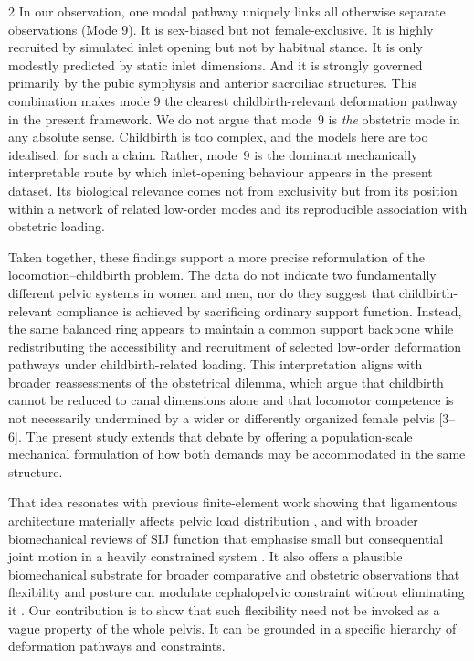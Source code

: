 \documentclass[openacc]{rsproca_new}
\begin{document}
\begin{multicols}{2}
In our observation, one modal pathway uniquely links all otherwise separate observations (Mode 9). It is sex-biased but not female-exclusive. It is highly recruited by simulated inlet opening but not by habitual stance. It is only modestly predicted by static inlet dimensions. And it is strongly governed primarily by the pubic symphysis and anterior sacroiliac structures. This combination makes mode 9 the clearest childbirth-relevant deformation pathway in the present framework. We do not argue that mode~9 is \emph{the} obstetric mode in any absolute sense. Childbirth is too complex, and the models here are too idealised, for such a claim. Rather, mode~9 is the dominant mechanically interpretable route by which inlet-opening behaviour appears in the present dataset. Its biological relevance comes not from exclusivity but from its position within a network of related low-order modes and its reproducible association with obstetric loading.

Taken together, these findings support a more precise reformulation of the locomotion–childbirth problem. The data do not indicate two fundamentally different pelvic systems in women and men, nor do they suggest that childbirth-relevant compliance is achieved by sacrificing ordinary support function. Instead, the same balanced ring appears to maintain a common support backbone while redistributing the accessibility and recruitment of selected low-order deformation pathways under childbirth-related loading. This interpretation aligns with broader reassessments of the obstetrical dilemma, which argue that childbirth cannot be reduced to canal dimensions alone and that locomotor competence is not necessarily undermined by a wider or differently organized female pelvis [3–6]. The present study extends that debate by offering a population-scale mechanical formulation of how both demands may be accommodated in the same structure.


That idea resonates with previous finite-element work showing that ligamentous architecture materially affects pelvic load distribution \cite{Eichenseer2011,Hammer2013}, and with broader biomechanical reviews of SIJ function that emphasise small but consequential joint motion in a heavily constrained system \cite{Vleeming2012,Kiapour2019,ChoKwak2020}. It also offers a plausible biomechanical substrate for broader comparative and obstetric observations that flexibility and posture can modulate cephalopelvic constraint without eliminating it \cite{Pink2024,Fremondiere2022}. Our contribution is to show that such flexibility need not be invoked as a vague property of the whole pelvis. It can be grounded in a specific hierarchy of deformation pathways and constraints.


\end{multicols}
\end{document}
